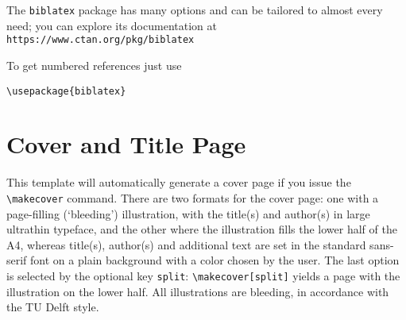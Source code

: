 The \texttt{biblatex} package has many options and can be tailored to almost
every need; you can explore its documentation at
\texttt{https://www.ctan.org/pkg/biblatex}

To get numbered references just use
\begin{verbatim}
\usepackage{biblatex}

\end{verbatim}


\section{Cover and Title Page}

This template will automatically generate a cover page if you issue the \verb|\makecover| command. There are two formats for the cover page: one with a page-filling (`bleeding')
illustration, with the title(s) and author(s) in large ultrathin typeface, and the other where the illustration fills the lower half of the A4, whereas title(s), author(s) and additional
text are set in the standard sans-serif font on a plain background with a color chosen by the user. The last option is selected by the optional key \texttt{split}: \verb|\makecover[split]| yields
a page with the illustration on the lower half. All illustrations are bleeding, in accordance with the TU Delft style.

